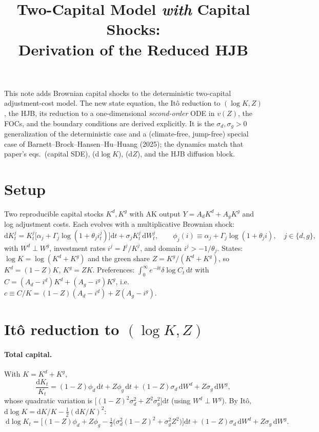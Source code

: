 \documentclass[11pt]{article}
\title{Two-Capital Model \emph{with} Capital Shocks:\\ Derivation of the Reduced HJB}
\author{}
\date{}
\newcommand{\dd}{\mathrm{d}}
\begin{document}
\maketitle
\vspace{-3em}

This note adds Brownian capital shocks to the deterministic two-capital
adjustment-cost model. The new state equation, the It\^o reduction to
$(\log K,Z)$, the HJB, its reduction to a one-dimensional \emph{second-order} ODE
in $v(Z)$, the FOCs, and the boundary conditions are derived explicitly. It is the
$\sigma_d,\sigma_g>0$ generalization of the deterministic case and a (climate-free,
jump-free) special case of Barnett--Brock--Hansen--Hu--Huang (2025); the dynamics
match that paper's eqs.\ (capital SDE), (d$\log K$), (d$Z$), and the HJB diffusion
block.

\section{Setup}

Two reproducible capital stocks $K^d,K^g$ with AK output $Y=A_dK^d+A_gK^g$ and
log adjustment costs. Each evolves with a multiplicative Brownian shock:
\[
\dd K^j_t = K^j_t\big[\alpha_j+\Gamma_j\log(1+\theta_j i^j_t)\big]\dd t
+\sigma_j K^j_t\,\dd W^j_t,\qquad
\phi_j(i)\equiv\alpha_j+\Gamma_j\log(1+\theta_j i),\quad j\in\{d,g\},
\]
with $W^d\perp W^g$, investment rates $i^j=I^j/K^j$, and domain $i^j>-1/\theta_j$.
States: $\log K=\log(K^d+K^g)$ and the green share $Z=K^g/(K^d+K^g)$, so
$K^d=(1-Z)K$, $K^g=ZK$. Preferences: $\int_0^\infty e^{-\delta t}\delta\log C_t\,\dd t$
with $C=(A_d-i^d)K^d+(A_g-i^g)K^g$, i.e.\ $c\equiv C/K=(1-Z)(A_d-i^d)+Z(A_g-i^g)$.

\section{It\^o reduction to $(\log K,Z)$}

\paragraph{Total capital.} With $K=K^d+K^g$,
\[
\frac{\dd K_t}{K_t}=(1-Z)\phi_d\,\dd t+Z\phi_g\,\dd t+(1-Z)\sigma_d\,\dd W^d+Z\sigma_g\,\dd W^g,
\]
whose quadratic variation is $\big[(1-Z)^2\sigma_d^2+Z^2\sigma_g^2\big]\dd t$ (using
$W^d\perp W^g$). By It\^o, $\dd\log K=\dd K/K-\tfrac12(\dd K/K)^2$:
\[
\boxed{\ \dd\log K_t=\Big[(1-Z)\phi_d+Z\phi_g-\tfrac12\big(\sigma_d^2(1-Z)^2+\sigma_g^2Z^2\big)\Big]\dd t
+(1-Z)\sigma_d\,\dd W^d+Z\sigma_g\,\dd W^g.\ }
\]
\end{document}
